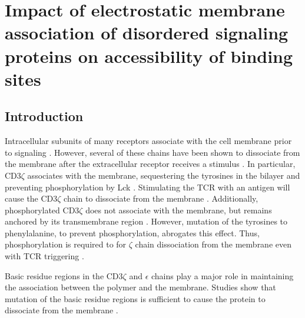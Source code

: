 \documentclass[../../AdvancementSummary.tex]{subfiles}
\begin{document}
\section{Impact of electrostatic membrane association of disordered signaling proteins on accessibility of binding sites}

\subsection{Introduction}

Intracellular subunits of many receptors associate with the cell membrane prior to signaling \cite{Xu2008, Shi2013, Zhang2011, Dobbins2016}. 
However, several of these chains have been shown to dissociate from the membrane after the extracellular receptor receives a stimulus \cite{Zhang2011, Dobbins2016}.
In particular, CD3$\zeta$ associates with the membrane, sequestering the tyrosines in the bilayer and preventing phosphorylation by Lck \cite{Aivazian2000, Zhang2011, Shi2013}.
Stimulating the TCR with an antigen will cause the CD3$\zeta$ chain to dissociate from the membrane \cite{Zhang2011}.
Additionally, phosphorylated CD3$\zeta$ does not associate with the membrane, but remains anchored by its transmembrane region  \cite{Aivazian2000, Zhang2011}.
However, mutation of the tyrosines to phenylalanine, to prevent phosphorylation, abrogates this effect. Thus, phosphorylation is required to for $\zeta$ chain dissociation from the membrane even with TCR triggering  \cite{Zhang2011}.

Basic residue regions in the CD3$\zeta$ and $\epsilon$ chains play a major role in maintaining the association between the polymer and the membrane.
Studies show that mutation of the basic residue regions is sufficient to cause the protein to dissociate from the membrane \cite{Zhang2011}.
\end{document}
